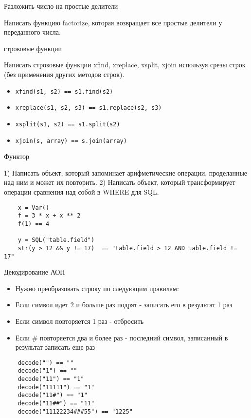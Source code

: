 \documentclass{article}
\begin{document}
\begin{center} Разложить число на простые делители \end{center}
Написать функцию factorize, которая возвращает все простые делители
у переданного числа.
\newpage

\begin{center} строковые функции \end{center}
Написать строковые функции xfind, xreplace, xsplit, xjoin используя
срезы строк (без применения других методов строк).
\begin{itemize}
    \item \lstinline!xfind(s1, s2) == s1.find(s2)!
    \item \lstinline!xreplace(s1, s2, s3) == s1.replace(s2, s3)!
    \item \lstinline!xsplit(s1, s2) == s1.split(s2)!
    \item \lstinline!xjoin(s, array) == s.join(array)!
\end{itemize}
\newpage

\begin{center} Функтор \end{center}
1) Написать объект, который запоминает арифметические операции, проделанные над ним 
и может их повторить.
2) Написать объект, который трансформирует операции сравнения над собой в WHERE для SQL.

\begin{lstlisting}
    x = Var()
    f = 3 * x + x ** 2
    f(1) == 4

    y = SQL("table.field")
    str(y > 12 && y != 17)  == "table.field > 12 AND table.field != 17"
\end{lstlisting}
\newpage

\begin{center} Декодирование АОН \end{center}
\begin{itemize}
    \item Нужно преобразовать строку по следующим правилам:
    \item Если символ идет 2 и больше раз подрят - записать его в результат 1 раз
    \item Если символ повторяется 1 раз - отбросить
    \item Если \# повторяется два и более раз - последний символ, записанный в результат записать еще раз
\end{itemize}
\begin{lstlisting}
    decode("") == ""
    decode("1") == ""
    decode("11") == "1"
    decode("11111") == "1"
    decode("11#") == "1"
    decode("11##") == "11"
    decode("11122234###55") == "1225"
\end{lstlisting}
\newpage
\end{document}
